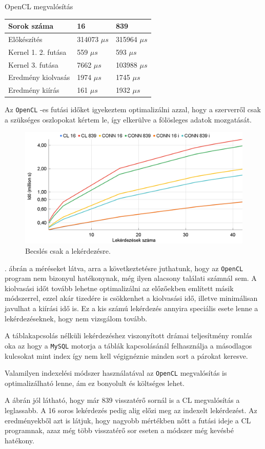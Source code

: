 OpenCL megvalósítás

\begin{table}[h!]
\centering
\begin{tabular}{|p{6cm}|p{3cm}|p{3cm}|}
\hline
Sorok száma & 16 & 839 \\
\hline
\hline
Előkészítés & 314073 $\mu s$ & 315964 $\mu s$ \\
\hline
Kernel 1. 2. futása & 559 $\mu s$ & 593 $\mu s$ \\
\hline
Kernel 3. futása & 7662 $\mu s$ & 103988 $\mu s$ \\
\hline
Eredmény kiolvasás & 1974 $\mu s$ & 1745 $\mu s$ \\
\hline
Eredmény kiírás & 161 $\mu s$ & 1932 $\mu s$ \\
\hline
\end{tabular}
\end{table}	

Az \texttt{OpenCL} -es futási időket igyekeztem optimalizálni azzal, hogy a szerverről csak a szükséges oszlopokat kértem le, így elkerülve a fölösleges adatok mozgatását.

\begin{figure}[h!]
\centering
\includegraphics[width=\textwidth]{images/test/join2.png}
\caption{Becslés csak a lekérdezésre.}
\label{fig:join}
\end{figure}

. ábrán a méréseket látva, arra a következtetésre juthatunk, hogy az \texttt{OpenCL} program nem bizonyul hatékonynak, még ilyen alacsony találati számnál sem. A kiolvasási időt tovább lehetne optimalizálni az előzőekben említett másik módszerrel, ezzel akár tizedére is csökkenhet a kiolvasási idő, illetve minimálisan javulhat a kiírási idő is. Ez a kis számú lekérdezés annyira speciális esete lenne a lekérdezéseknek, hogy nem vizsgálom tovább.

A táblakapcsolás nélküli lekérdezéshez viszonyított drámai teljesítmény romlás oka az hogy a \texttt{MySQL} motorja a táblák kapcsolásánál felhasználja a másodlagos kulcsokat mint index így nem kell végignéznie minden sort a párokat keresve.

Valamilyen indexelési módszer használatával az \texttt{OpenCL} megvalósítás is optimalizálható lenne, ám ez bonyolult és költséges lehet.

A  ábrán jól látható, hogy már 839 visszatérő sornál is a CL megvalósítás a leglassabb. A 16 soros lekérdezés pedig alig előzi meg az indexelt lekérdezést.
Az eredményekből azt is látjuk, hogy nagyobb mértékben nőtt a futási ideje a CL programnak, azaz még több visszatérő sor eseten a módszer még kevésbé hatékony.
